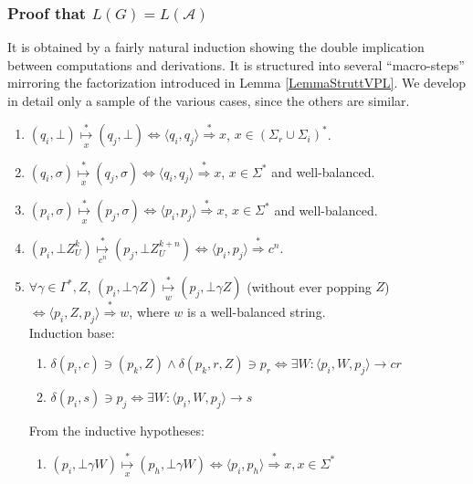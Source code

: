 \documentclass[3p,11pt]{elsarticle}
\begin{document}
\subsubsection*{Proof that $L(G)= L(\mathcal{A})$}
It is obtained by a fairly natural induction showing the double implication between computations and derivations. It is structured into several ``macro-steps'' mirroring the factorization introduced in Lemma \ref{LemmaStruttVPL}. We develop in detail only a sample of the various cases, since the others are similar.
\begin{enumerate}
    \item $(q_i, \bot)  \underset{x}{\stackrel*\mapsto} (q_j,  \bot) \iff
    \langle  q_i,q_j \rangle \stackrel{\ast}{\Rightarrow} x$, $x \in (\Sigma_r \cup \Sigma_i)^\ast$.
    \\

    \item $(q_i, \sigma)  \underset{x}{\stackrel*\mapsto} (q_j,  \sigma) \iff
    \langle  q_i,q_j \rangle \stackrel{\ast}{\Rightarrow} x$, $x \in  \Sigma^\ast$ and well-balanced.
    \\

    \item $(p_i, \sigma)  \underset{x}{\stackrel*\mapsto} (p_j, \sigma) \iff
    \langle p_i, p_j\rangle \stackrel{\ast}{\Rightarrow} x$, $x \in \Sigma^\ast$ and well-balanced.
    \\

    \item $(p_i, \bot Z_U^k)  \underset{c^n}{\stackrel*\mapsto} (p_j, \bot Z_U^{k+n})\iff
    \langle p_i, p_j\rangle \stackrel{\ast}{\Rightarrow} c^n$.
    \\
\item $\forall \gamma \in \Gamma^\ast, Z$,
    $(p_i, \bot \gamma Z)  \underset{w}{\stackrel*\mapsto} (p_j,\bot \gamma Z)$ (without ever popping $Z$)
    $ \iff
    \langle p_i, Z, p_j\rangle \stackrel{\ast}{\Rightarrow} w$, where $w$ is a well-balanced string.
    \\
    Induction base:
    \begin{enumerate}
        \item $\delta(p_i,c)\ni (p_k, Z) \wedge \delta(p_k,r,Z)\ni p_r \iff
       \exists W:  \langle p_i, W, p_j\rangle \to cr$


        \item $\delta(p_i,s)\ni p_j \iff \exists W:  \langle p_i, W, p_j\rangle \to s$
    \end{enumerate}
     From the inductive hypotheses:
     \begin{enumerate}
        \item $(p_i, \bot \gamma W)  \underset{x}{\stackrel*\mapsto} (p_h, \bot \gamma W)\iff
         \langle p_i, p_h\rangle \stackrel{\ast}{\Rightarrow} x, x\in \Sigma^\ast$


\end{enumerate}
\end{enumerate}
\end{document}
